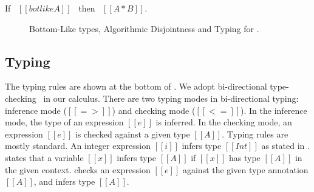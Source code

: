 
\begin{lemma}
  If \ $[[botlike A]]$ \ then \ $[[A * B]]$.
\label{lemma:union:bl-disjoint}
\end{lemma}



\begin{figure}[t]
  \begin{small}
    \centering
  \end{small}
  \begin{small}
    \centering
  \end{small}
  \begin{small}
    \centering
  \end{small}
  \caption{Bottom-Like types, Algorithmic Disjointness and Typing for \cal.}
  \label{fig:union:disj-typ}
\end{figure}


\subsection{Typing}
\label{sec:union:typ}
The typing rules are shown at the bottom of .
We adopt bi-directional type-checking~\cite{} in our calculus.  There
are two typing modes in bi-directional typing: inference mode
($[[=>]]$) and checking mode ($[[<=]]$). In the inference mode, the type of
an expression $[[e]]$ is inferred.  In the checking
mode, an expression $[[e]]$ is checked against a given type $[[A]]$.
Typing rules are mostly standard. An integer
expression $[[i]]$ infers type $[[Int]]$ as stated in .
 states that a variable $[[x]]$ infers type $[[A]]$ if
$[[x]]$ has type $[[A]]$ in the given context. 
checks an expression $[[e]]$ against the given type annotation $[[A]]$,
and infers type $[[A]]$.

